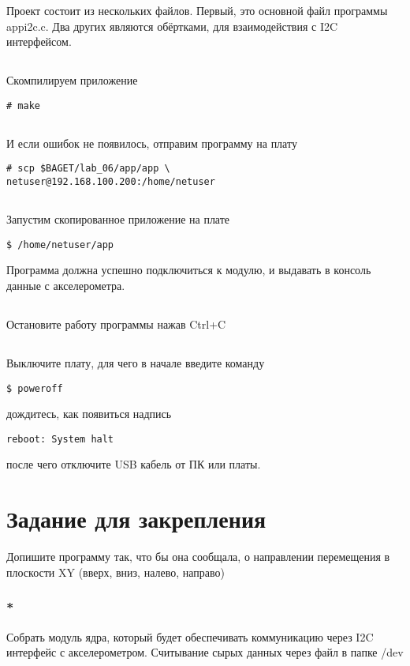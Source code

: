 Проект состоит из нескольких файлов. Первый, это основной файл программы appi2c.c. Два других являются обёртками, для взаимодействия с I2C интерфейсом.

\subsection{}Скомпилируем приложение
\begin{lstlisting}[style=bash]
# make
\end{lstlisting}

\subsection{}И если ошибок не появилось, отправим программу на плату
\begin{lstlisting}[style=bash]
# scp $BAGET/lab_06/app/app \
netuser@192.168.100.200:/home/netuser
\end{lstlisting}

\subsection{}Запустим скопированное приложение на плате
\begin{lstlisting}[style=bash]
$ /home/netuser/app
\end{lstlisting}

Программа должна успешно подключиться к модулю, и выдавать в консоль данные с акселерометра.

\subsection{}Остановите работу программы нажав Ctrl+C

\subsection{} Выключите плату, для чего в начале введите команду
\begin{lstlisting}[style=bash]
	$ poweroff
\end{lstlisting}
дождитесь, как появиться надпись
\begin{lstlisting}[style=stdout]
	reboot: System halt
\end{lstlisting}
после чего отключите USB кабель от ПК или платы. 

\section{Задание для закрепления}

Допишите программу так, что бы она сообщала, о направлении перемещения в плоскости XY (вверх, вниз, налево, направо)

\subsubsection{*} Собрать модуль ядра, который будет обеспечивать коммуникацию через I2C интерфейс с акселерометром. Считывание сырых данных через файл в папке /dev